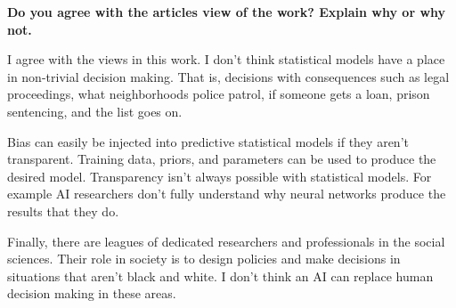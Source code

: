 \documentclass[fleqn]{hermans-hw}
\begin{document}
{\bf  Do you agree with the articles view of the work? Explain why or why not. }

I agree with the views in this work. I don't think statistical models have a place in non-trivial decision making. That is, decisions with consequences such as legal proceedings, what neighborhoods police patrol, if someone gets a loan, prison sentencing, and the list goes on.

Bias can easily be injected into predictive statistical models if they aren't transparent. Training data, priors, and parameters can be used to produce the desired model. Transparency isn't always possible with statistical models. For example AI researchers don't fully understand why neural networks produce the results that they do.

Finally, there are leagues of dedicated researchers and professionals in the social sciences. Their role in society is to design policies and make decisions in situations that aren't black and white. I don't think an AI can replace human decision making in these areas.
\end{document}
